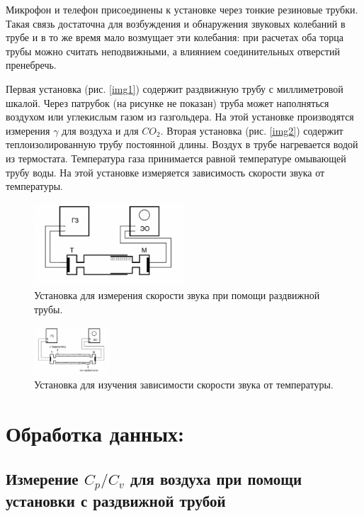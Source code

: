 \documentclass[11pt]{article}
\begin{document}
Микрофон и телефон присоединены к установке через тонкие резиновые трубки. Такая связь достаточна для возбуждения и обнаружения звуковых колебаний в трубе и в то же время мало возмущает эти колебания: при расчетах оба торца трубы можно считать неподвижными, а влиянием соединительных отверстий пренебречь.

Первая установка (рис. \ref{img1}) содержит раздвижную трубу с миллиметровой шкалой. Через патрубок (на рисунке не показан) труба может наполняться воздухом или углекислым газом из газгольдера. На этой установке производятся измерения $ \gamma $ для воздуха и для $ CO_2 $. Вторая установка (рис. \ref{img2}) содержит теплоизолированную трубу постоянной длины. Воздух в трубе нагревается водой из термостата. Температура газа принимается равной температуре омывающей трубу воды. На этой установке измеряется зависимость скорости звука от температуры.

\begin{figure}[H]
\centering
\captionsetup{justification=centering}
\includegraphics[width=0.5\textwidth]{Pic1.png}
\caption{Установка для измерения скорости звука при помощи раздвижной трубы.}
\end{figure}

\begin{figure}[H]
\centering
\captionsetup{justification=centering}
\includegraphics[width=0.25\textwidth]{Pic2.png}
\caption{Установка для изучения зависимости скорости звука от температуры.}
\end{figure}


\section{Обработка данных:}
\subsection{Измерение $ C_p/C_v $ для воздуха при помощи установки с раздвижной трубой}
\end{document}
